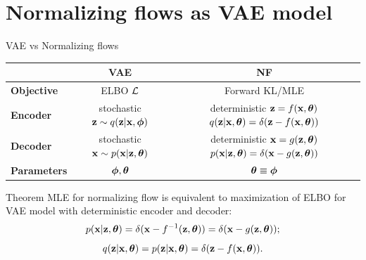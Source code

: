 \section{Normalizing flows as VAE model}
\begin{frame}{VAE vs Normalizing flows}
	\begin{table}[]
		\begin{tabular}{l|c|c}
			& \textbf{VAE} & \textbf{NF} \\ \hline
			\textbf{Objective} & ELBO $\mathcal{L}$ & Forward KL/MLE \\ \hline
			\textbf{Encoder} & \shortstack{stochastic \\ $\mathbf{z} \sim q (\mathbf{z} | \mathbf{x}, \boldsymbol{\phi})$} &  \shortstack{\\ deterministic \\ $\mathbf{z} = f(\mathbf{x}, \boldsymbol{\theta})$ \\ $q(\mathbf{z} | \mathbf{x}, \boldsymbol{\theta}) = \delta(\mathbf{z} - f(\mathbf{x}, \boldsymbol{\theta}))$}  \\ \hline
			\textbf{Decoder} & \shortstack{stochastic \\ $\mathbf{x} \sim p (\mathbf{x} | \mathbf{z}, \boldsymbol{\theta})$} & \shortstack{\\ deterministic \\ $\mathbf{x} = g(\mathbf{z}, \boldsymbol{\theta})$ \\ $ p(\mathbf{x} | \mathbf{z}, \boldsymbol{\theta}) = \delta(\mathbf{x} - g(\mathbf{z}, \boldsymbol{\theta}))$} \\ \hline
			\textbf{Parameters}  & $\boldsymbol{\phi}, \boldsymbol{\theta}$ & $\boldsymbol{\theta} \equiv \boldsymbol{\phi}$\\ 
		\end{tabular}
	\end{table}
	\begin{block}{Theorem}
		MLE for normalizing flow is equivalent to maximization of ELBO for VAE model with deterministic encoder and decoder:
		\vspace{-0.3cm}
		\[
			p(\mathbf{x} | \mathbf{z}, \boldsymbol{\theta}) = \delta (\mathbf{x} - f^{-1}(\mathbf{z}, \boldsymbol{\theta})) = \delta (\mathbf{x} - g(\mathbf{z}, \boldsymbol{\theta}));
		\]
		\[
			q(\mathbf{z} | \mathbf{x}, \boldsymbol{\theta}) = p(\mathbf{z} | \mathbf{x}, \boldsymbol{\theta}) = \delta (\mathbf{z} - f(\mathbf{x}, \boldsymbol{\theta})).
		\]
	\end{block}
\end{frame}
